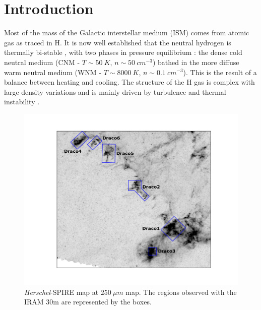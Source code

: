 \documentclass[traditabstract]{aa}
\begin{document}


\section{Introduction}

   Most of the mass of the Galactic interstellar medium (ISM) comes from atomic gas as traced in H. It is now well established that the neutral hydrogen is thermally bi-stable \citep{Clark_1965,Dickey_2003}, with two phases in pressure equilibrium \citep{Field_1965,Field_1969,Goldsmith_1969, Wolfire_1995a,Wolfire_2003}: the dense cold neutral medium (CNM - $T\sim 50\: K$, $n\sim 50\: cm^{-3}$) bathed in the more diffuse warm neutral medium (WNM - $T\sim 8000\: K$, $n\sim 0.1\: cm^{-3}$). This is the result of a balance between heating and cooling. The structure of the H gas is complex with large density variations and is mainly driven by turbulence and thermal instability \citep{Field_1965,Field_1969}.

\begin{figure}[h!]
  \centering
  \includegraphics[width=0.7\linewidth,trim=165 85 135 85,clip=true]{Figures/Draco_overview.png}
  \caption{\label{overview} \emph{Herschel}-SPIRE map at $250\: \mu m$ map. The regions observed with the IRAM 30m are represented 
by the boxes.}
\end{figure}
\end{document}
